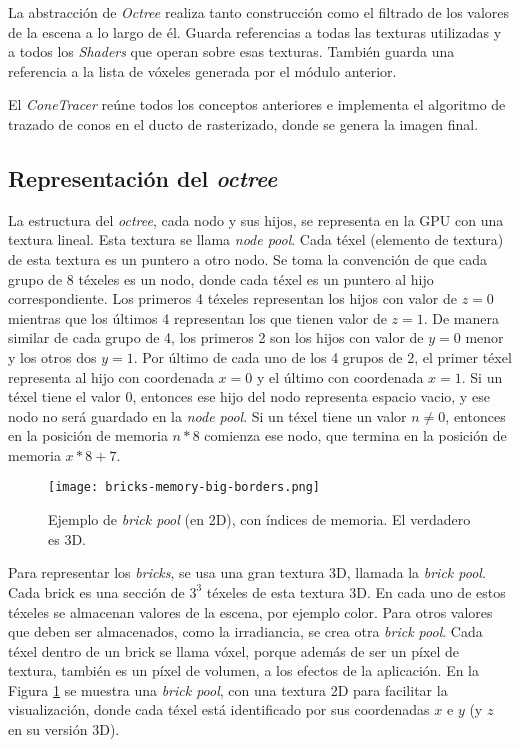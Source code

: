 La abstracción de \textit{Octree} realiza tanto construcción como el filtrado de los valores de la escena a lo largo de él.
Guarda referencias a todas las texturas utilizadas y a todos los \textit{Shaders} que operan sobre esas texturas.
También guarda una referencia a la lista de vóxeles generada por el módulo anterior.

El \textit{ConeTracer} reúne todos los conceptos anteriores e implementa el algoritmo de trazado de conos en el ducto de rasterizado, donde se genera la imagen final.

\subsection{Representación del \textit{octree}}

La estructura del \textit{octree}, cada nodo y sus hijos, se representa en la GPU con una textura lineal.
Esta textura se llama \textit{node pool}.
Cada téxel (elemento de textura) de esta textura es un puntero a otro nodo.
Se toma la convención de que cada grupo de 8 téxeles es un nodo, donde cada téxel es un puntero al hijo correspondiente.
Los primeros 4 téxeles representan los hijos con valor de $z = 0$ mientras que los últimos 4 representan los que tienen valor de $z = 1$.
De manera similar de cada grupo de 4, los primeros 2 son los hijos con valor de $y = 0$ menor y los otros dos $y = 1$.
Por último de cada uno de los 4 grupos de 2, el primer téxel representa al hijo con coordenada $x = 0$ y el último con coordenada $x = 1$.
Si un téxel tiene el valor $0$, entonces ese hijo del nodo representa espacio vacio, y ese nodo no será guardado en la \textit{node pool}.
Si un téxel tiene un valor $n \not = 0$, entonces en la posición de memoria $n * 8$ comienza ese nodo, que termina en la posición de memoria $x * 8 + 7$.

\begin{figure}[h!]
    \centering
    \texttt{[image: bricks-memory-big-borders.png]}
    \caption{Ejemplo de \textit{brick pool} (en 2D), con índices de memoria. El verdadero es 3D.}
    \label{fig:brick_pool_example}
\end{figure}

Para representar los \textit{bricks}, se usa una gran textura 3D, llamada la \textit{brick pool}.
Cada brick es una sección de $3^3$ téxeles de esta textura 3D.
En cada uno de estos téxeles se almacenan valores de la escena, por ejemplo color.
Para otros valores que deben ser almacenados, como la irradiancia, se crea otra \textit{brick pool}.
Cada téxel dentro de un brick se llama vóxel, porque además de ser un píxel de textura, también es un píxel de volumen, a los efectos de la aplicación.
En la Figura \ref{fig:brick_pool_example} se muestra una \textit{brick pool}, con una textura 2D para facilitar la visualización, donde cada téxel está identificado por sus coordenadas $x$ e $y$ (y $z$ en su versión 3D).


